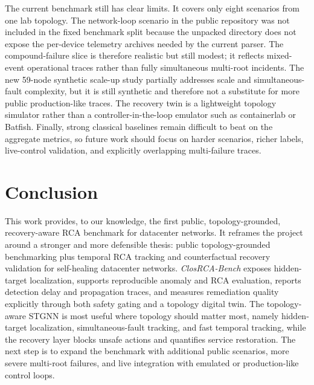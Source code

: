 \documentclass[conference]{IEEEtran}
\begin{document}
The current benchmark still has clear limits. It covers only eight scenarios from one lab topology. The network-loop scenario in the public repository was not included in the fixed benchmark split because the unpacked directory does not expose the per-device telemetry archives needed by the current parser. The compound-failure slice is therefore realistic but still modest; it reflects mixed-event operational traces rather than fully simultaneous multi-root incidents. The new 59-node synthetic scale-up study partially addresses scale and simultaneous-fault complexity, but it is still synthetic and therefore not a substitute for more public production-like traces. The recovery twin is a lightweight topology simulator rather than a controller-in-the-loop emulator such as containerlab or Batfish. Finally, strong classical baselines remain difficult to beat on the aggregate metrics, so future work should focus on harder scenarios, richer labels, live-control validation, and explicitly overlapping multi-failure traces.

\section{Conclusion}
This work provides, to our knowledge, the first public, topology-grounded, recovery-aware RCA benchmark for datacenter networks. It reframes the project around a stronger and more defensible thesis: public topology-grounded benchmarking plus temporal RCA tracking and counterfactual recovery validation for self-healing datacenter networks. \textit{ClosRCA-Bench} exposes hidden-target localization, supports reproducible anomaly and RCA evaluation, reports detection delay and propagation traces, and measures remediation quality explicitly through both safety gating and a topology digital twin. The topology-aware STGNN is most useful where topology should matter most, namely hidden-target localization, simultaneous-fault tracking, and fast temporal tracking, while the recovery layer blocks unsafe actions and quantifies service restoration. The next step is to expand the benchmark with additional public scenarios, more severe multi-root failures, and live integration with emulated or production-like control loops.



\end{document}
